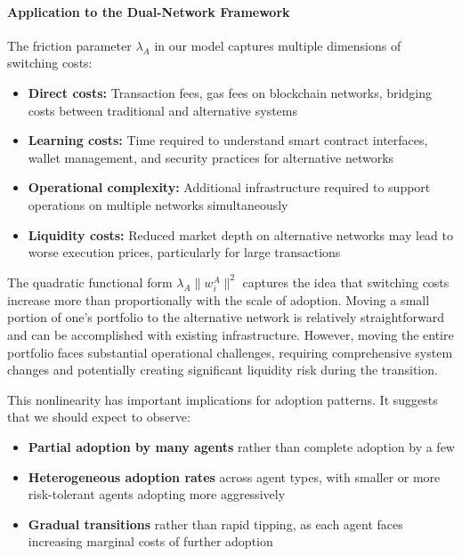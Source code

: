 \paragraph{Application to the Dual-Network Framework}

The friction parameter $\lambda_A$ in our model captures multiple dimensions of switching costs:

\begin{itemize}
    \item \textbf{Direct costs:} Transaction fees, gas fees on blockchain networks, bridging costs between traditional and alternative systems
    \item \textbf{Learning costs:} Time required to understand smart contract interfaces, wallet management, and security practices for alternative networks
    \item \textbf{Operational complexity:} Additional infrastructure required to support operations on multiple networks simultaneously
    \item \textbf{Liquidity costs:} Reduced market depth on alternative networks may lead to worse execution prices, particularly for large transactions
\end{itemize}

The quadratic functional form $\lambda_A \|w_i^A\|^2$ captures the idea that switching costs increase more than proportionally with the scale of adoption. Moving a small portion of one's portfolio to the alternative network is relatively straightforward and can be accomplished with existing infrastructure. However, moving the entire portfolio faces substantial operational challenges, requiring comprehensive system changes and potentially creating significant liquidity risk during the transition.

This nonlinearity has important implications for adoption patterns. It suggests that we should expect to observe:

\begin{itemize}
    \item \textbf{Partial adoption by many agents} rather than complete adoption by a few
    \item \textbf{Heterogeneous adoption rates} across agent types, with smaller or more risk-tolerant agents adopting more aggressively
    \item \textbf{Gradual transitions} rather than rapid tipping, as each agent faces increasing marginal costs of further adoption
\end{itemize}

